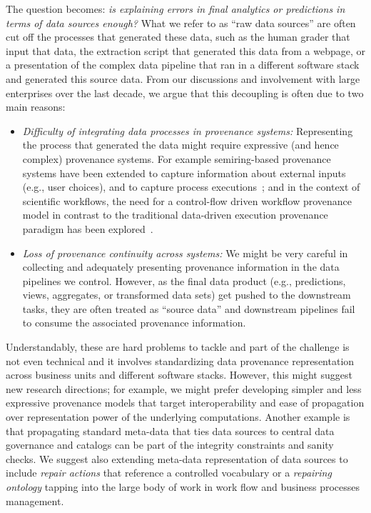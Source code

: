 The question becomes: \emph{is explaining errors in final analytics or predictions in terms of data sources enough?} What we refer to as ``raw data sources''  are often cut off the processes that generated these data, such as the human grader that input that data, the extraction script that generated this data from a webpage, or a presentation of the complex data pipeline that ran in a different software stack and generated this source data. From our discussions and involvement with large enterprises over the last decade, we argue that this decoupling is often due to two main reasons:
\begin{itemize}
\item \emph{Difficulty of integrating data processes in provenance systems:} Representing the process that generated the data might require expressive (and hence  complex) provenance systems. For example semiring-based  provenance systems have been extended  to capture information about external inputs (e.g., user choices), and  to capture process executions~\cite{DBLP:journals/vldb/DeutchMT15}; and in the context of scientific workflows,  the need for a control-flow driven workflow provenance model in contrast to the traditional  data-driven execution provenance paradigm has been explored~\cite{DBLP:journals/dke/ButtF21}.

\item \emph{Loss of provenance continuity across systems:}  We might be very careful in collecting and adequately presenting provenance information in the data pipelines we control. However, as the final data product (e.g., predictions, views, aggregates, or transformed data sets) get pushed to the downstream tasks, they are often treated as ``source data'' and downstream pipelines fail to  consume the associated provenance information.
\end{itemize}

Understandably, these are hard problems to tackle and part of the challenge is not even technical and it involves standardizing data provenance representation across business units and different software stacks. However, this might suggest new research directions; for example, we might prefer developing simpler and less expressive provenance models that target interoperability and ease of propagation over representation power of the underlying computations. Another example is that propagating standard meta-data that ties data sources to central data governance and catalogs can be part of the integrity constraints and sanity checks. We suggest also extending meta-data representation of data sources to include {\em repair actions} that reference a controlled vocabulary or a {\em repairing ontology} tapping into the large body of work in work flow and business processes management.




